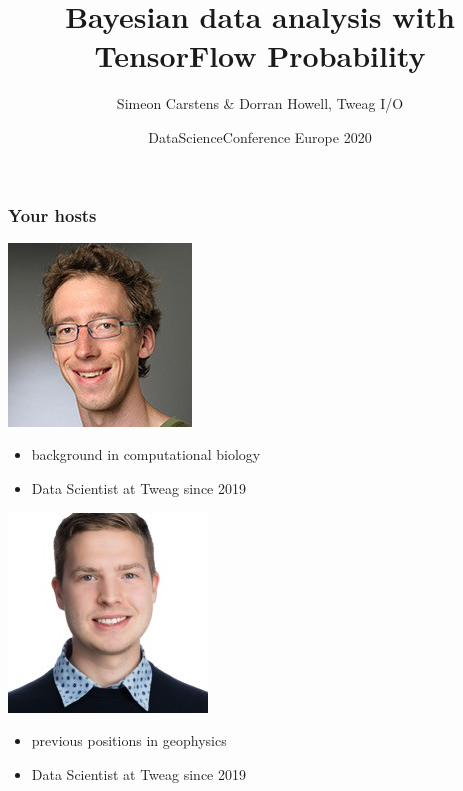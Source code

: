 \documentclass[t,aspectratio=169]{beamer}
\title{Bayesian data analysis with TensorFlow Probability}
\date{DataScienceConference Europe 2020}
\author{Simeon Carstens \& Dorran Howell, Tweag I/O}
\begin{document}
\begin{frame}
  \titlepage
\end{frame}


\begin{frame}
  \frametitle{Your hosts}
  \begin{tcolorbox}[title=Simeon will give the presentation]
    \begin{minipage}{0.3\textwidth}{
        \includegraphics[width=0.15\paperwidth]{images/simeon}}
    \end{minipage}
    \begin{minipage}{0.6\textwidth}
    \begin{itemize}
    \item background in computational biology
    \item Data Scientist at Tweag since 2019
    \end{itemize}
    \end{minipage}
  \end{tcolorbox}

  \begin{tcolorbox}[title=Dorran will happily answer questions]
    \begin{minipage}{0.3\textwidth}{
        \includegraphics[width=0.15\paperwidth]{images/dorran}}
    \end{minipage}
    \begin{minipage}{0.6\textwidth}
    \begin{itemize}
    \item previous positions in geophysics
    \item Data Scientist at Tweag since 2019
    \end{itemize}
    \end{minipage}
  \end{tcolorbox}
\end{frame}
\end{document}
